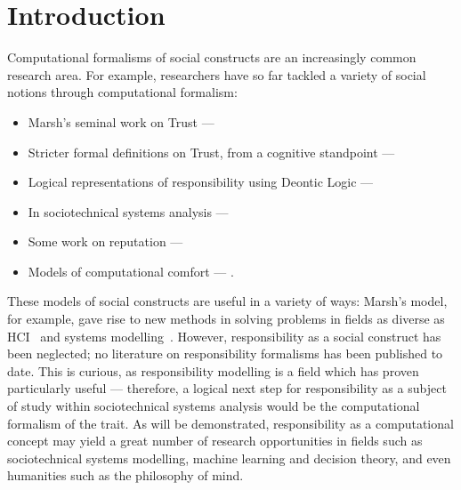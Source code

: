 \section{Introduction}\label{sec:intro}

Computational formalisms of social constructs are an increasingly common research area. For example, researchers have so far tackled a variety of social notions through computational formalism:

\begin{itemize}
    \item Marsh's seminal work on Trust --- \cite{Marsh1994FormalisingConcept}
    
    \item Stricter formal definitions on Trust, from a cognitive standpoint --- \cite{CastelfranchiSocialApproach}
    
    \item Logical representations of responsibility using Deontic Logic --- \cite{deontic-logic}
        
    \item In sociotechnical systems analysis --- \cite{Simpson2015FormalisingAnalysis}
    
    \item Some work on reputation --- \cite{Chandrasekaran2011ASystems}

    \item Models of computational comfort --- \cite{Marsh2011}.
    
\end{itemize}

These models of social constructs are useful in a variety of ways: Marsh's model, for example, gave rise to new methods in solving problems in fields as diverse as HCI~\cite{designing_with_trust} and systems modelling~\cite{Huynh2006}. However, responsibility as a social construct has been neglected; no literature on responsibility formalisms has been published to date. This is curious, as responsibility modelling is a field which has proven particularly useful --- therefore, a logical next step for responsibility as a subject of study within sociotechnical systems analysis would be the computational formalism of the trait. As will be demonstrated, responsibility as a computational concept may yield a great number of research opportunities in fields such as sociotechnical systems modelling, machine learning and decision theory, and even humanities such as the philosophy of mind.

